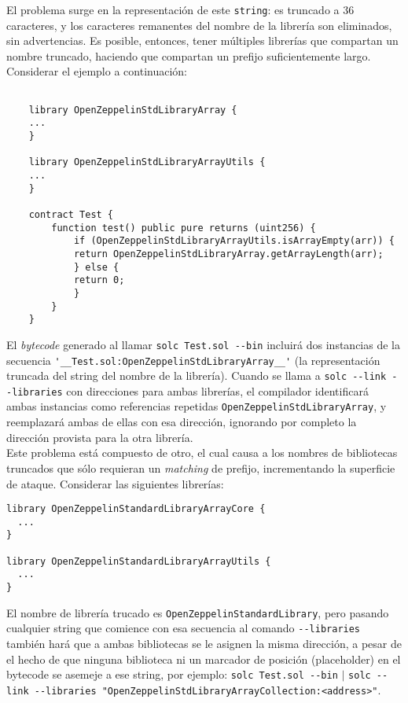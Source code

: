 El problema surge en la representación de este \texttt{string}: es truncado a 36 caracteres, y los caracteres remanentes del nombre de la librería son eliminados, sin advertencias. Es posible, entonces, tener múltiples librerías que compartan un nombre truncado, haciendo que compartan un prefijo suficientemente largo. Considerar el ejemplo a continuación:


\begin{lstlisting}[language=Solidity]
    
    library OpenZeppelinStdLibraryArray {
    ...
    }

    library OpenZeppelinStdLibraryArrayUtils {
    ...
    }

    contract Test {
        function test() public pure returns (uint256) {
            if (OpenZeppelinStdLibraryArrayUtils.isArrayEmpty(arr)) {
            return OpenZeppelinStdLibraryArray.getArrayLength(arr);
            } else {
            return 0;
            }   
        }
    }
\end{lstlisting}

El \textit{bytecode} generado al llamar \verb|solc Test.sol --bin| incluirá dos instancias de la secuencia \verb|'__Test.sol:OpenZeppelinStdLibraryArray__'| (la representación truncada del string del nombre de la librería). Cuando se llama a \verb|solc --link --libraries| con direcciones para ambas librerías, el compilador identificará ambas instancias como referencias repetidas \verb|OpenZeppelinStdLibraryArray|, y reemplazará ambas de ellas con esa dirección, ignorando por completo la dirección provista para la otra librería.\\

Este problema está compuesto de otro, el cual causa a los nombres de bibliotecas truncados que sólo requieran un \textit{matching} de prefijo, incrementando la superficie de ataque. Considerar las siguientes librerías:

\begin{lstlisting}[language=Solidity]
library OpenZeppelinStandardLibraryArrayCore {
  ...
}

library OpenZeppelinStandardLibraryArrayUtils {
  ...
}
\end{lstlisting}

El nombre de librería trucado es \verb|OpenZeppelinStandardLibrary|, pero pasando cualquier string que comience con esa secuencia al comando \verb|--libraries| también hará que a ambas bibliotecas se le asignen la misma dirección, a pesar de el hecho de que ninguna biblioteca ni un marcador de posición (placeholder) en el bytecode se asemeje a ese string, por ejemplo: \verb|solc Test.sol --bin| $\vert$ \verb|solc --link --libraries "OpenZeppelinStdLibraryArrayCollection:<address>"|.\\


